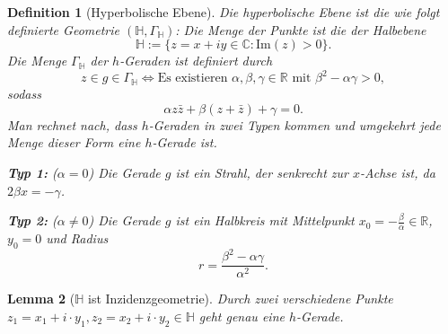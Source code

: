 \documentclass[a4paper,12pt]{article}
\theoremstyle{break}
\newtheorem{definition}{Definition}[section]
\newtheorem{lemma}[definition]{Lemma}
\begin{document}
\begin{definition}[Hyperbolische Ebene]
Die hyperbolische Ebene ist die wie folgt definierte Geometrie \((\mathbb{H}, \Gamma_\mathbb{H})\): Die Menge der Punkte ist die der Halbebene
\[
\mathbb{H} := \{ z = x + iy \in \mathbb{C} : \text{Im}(z) > 0 \}.
\]
Die Menge \(\Gamma_\mathbb{H}\) der \(h\)-Geraden ist definiert durch
\[
z \in g \in \Gamma_\mathbb{H} \iff \text{Es existieren } \alpha, \beta, \gamma \in \mathbb{R} \text{ mit } \beta^2 - \alpha \gamma > 0,
\]
sodass
\[
\alpha z \bar{z} + \beta (z + \bar{z}) + \gamma = 0.
\]
Man rechnet nach, dass \(h\)-Geraden in zwei Typen kommen und umgekehrt jede Menge dieser Form eine \(h\)-Gerade ist. 

\textbf{Typ 1:} (\(\alpha = 0\)) Die Gerade \(g\) ist ein Strahl, der senkrecht zur \(x\)-Achse ist, da \(2\beta x = -\gamma\).

\textbf{Typ 2:} (\(\alpha \neq 0\)) Die Gerade \(g\) ist ein Halbkreis mit Mittelpunkt \(x_0 = -\frac{\beta}{\alpha} \in \mathbb{R}\), \(y_0 = 0\) und Radius
\[
r = \frac{\beta^2 - \alpha \gamma}{\alpha^2}.
\]
\end{definition}

\begin{lemma}[\(\mathbb{H}\) ist Inzidenzgeometrie]\label{lemma:h_inzidenzgeometrie}
Durch zwei verschiedene Punkte \(z_1 = x_1 + i \cdot y_1, z_2 = x_2 + i \cdot y_2 \in \mathbb{H}\) geht genau eine \(h\)-Gerade.
\end{lemma}
\end{document}
